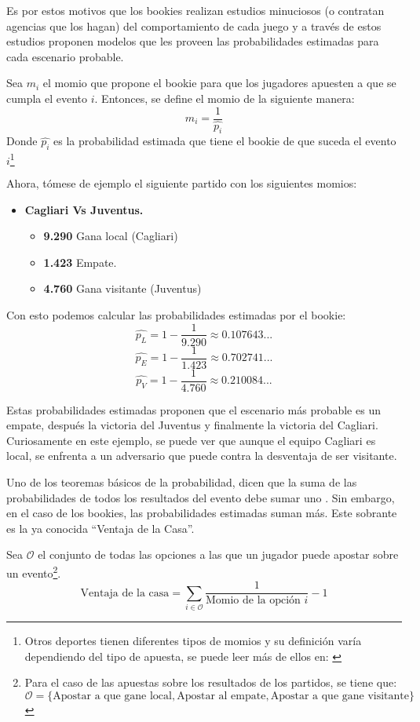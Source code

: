 Es por estos motivos que los bookies realizan estudios minuciosos (o contratan agencias que los hagan) del comportamiento  de cada juego y a través de estos estudios proponen modelos que les proveen las probabilidades estimadas para cada escenario probable.





 
 
 Sea $m_i$ el momio que propone el bookie para que los jugadores apuesten a que se cumpla el evento $i$. Entonces, se define el momio de la siguiente manera:
\[m_i = \frac{1}{\hat{p_i}}\]
Donde $\hat{p_i}$ es la probabilidad estimada que tiene el bookie de que suceda el evento $i$\footnote{Otros deportes tienen diferentes tipos de momios y su definición varía dependiendo del tipo de apuesta, se puede leer más de ellos en: \cite{ignatin1984sports}}

Ahora, tómese de ejemplo el siguiente partido con los siguientes momios:
\begin{itemize}

\item \textbf{Cagliari Vs Juventus.}
	\begin{itemize}
		\item \textbf{9.290} Gana local (Cagliari)
		\item \textbf{1.423} Empate.
		\item \textbf{4.760} Gana visitante (Juventus)
	\end{itemize}
\end{itemize}

Con esto podemos calcular las probabilidades estimadas por el bookie:
\[\hat{p_L} = 1 - \frac{1}{9.290} \approx 0.107643...\]
\[\hat{p_E} = 1 - \frac{1}{1.423} \approx 0.702741...\]
\[\hat{p_V} = 1 - \frac{1}{4.760} \approx 0.210084...\]

Estas probabilidades estimadas proponen que el escenario más probable es un empate, después la victoria del Juventus y finalmente la victoria del Cagliari. Curiosamente en este ejemplo, se puede ver que aunque el equipo Cagliari es local, se enfrenta a un adversario que puede contra la desventaja de ser visitante.

Uno de los teoremas básicos de la probabilidad, dicen que la suma de las probabilidades de todos los resultados del evento debe sumar uno \cite{ross2006first}. Sin embargo, en el caso de los bookies, las probabilidades estimadas suman más. Este sobrante es la ya conocida ``Ventaja de la Casa''.

Sea $\mathcal{O}$ el conjunto de todas las opciones a las que un jugador puede apostar sobre un evento\footnote{Para el caso de las apuestas sobre los resultados de los partidos, se tiene que: $\mathcal{O} = \{\text{Apostar a que gane local}, \text{Apostar al empate}, \text{Apostar a que gane visitante}\}$}.
\[\text{Ventaja de la casa} =  \sum_{i \in \mathcal{O}}\frac{1}{\text{Momio de la opción } i} - 1\] 

